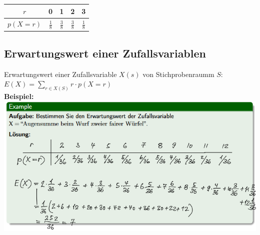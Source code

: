 \documentclass[12pt]{scrartcl}
\begin{document}
\renewcommand{\arraystretch}{1.5}
\begin{center}
    \begin{tabular}{ | c | c | c | c | c |}
        \hline
        $r$ & 0 & 1 & 2 & 3\\ 
        \hline
        $p(X=r)$ & $\frac{1}{8}$ & $\frac{3}{8}$ & $\frac{3}{8}$ & $\frac{1}{8}$\\ 
        \hline
    \end{tabular}
\end{center}


\newpage
\subsection{Erwartungswert einer Zufallsvariablen}
Erwartungswert einer Zufallsvariable $X(s)$ von Stichprobenraumm $S$:\\

$\displaystyle{E(X) = \sum_{r \in X(S)} r \cdot p(X=r)}$\\

\textbf{Beispiel:}\\
\includegraphics[width=14cm]{img/erwartungswert_zufallsvariable.png}\\
\end{document}
